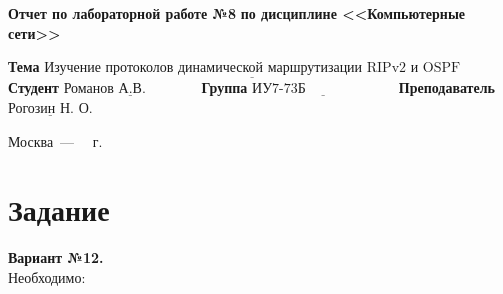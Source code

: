 \documentclass[12pt]{report}
\begin{document}
\begin{titlepage}
		\begin{center}
			\noindent\begin{minipage}{1.1\textwidth}\centering
				\Large\textbf{  Отчет по лабораторной работе №8}\newline
				\textbf{по дисциплине <<Компьютерные сети>>}\newline\newline\newline
			\end{minipage}
		\end{center}
		
		\noindent\textbf{Тема} $\underline{\text{
		Изучение протоколов динамической маршрутизации RIPv2 и OSPF}}$\newline\newline
		\noindent\textbf{Студент} $\underline{\text{Романов А.В.~~~~~~~~~~~}}$\newline\newline
		\noindent\textbf{Группа} $\underline{\text{ИУ7-73Б~~~~~~~~~~~~~~~~~~~}}$\newline\newline
		\noindent\textbf{Преподаватель} $\underline{\text{Рогозин Н. О.}}$\newline\newline\newline
		
		\begin{center}
			\vfill
			Москва~---~\the\year
			~г.
		\end{center}
	\end{titlepage}


\section*{Задание}

\textbf{Вариант №12.}\\

Необходимо:
\end{document}
